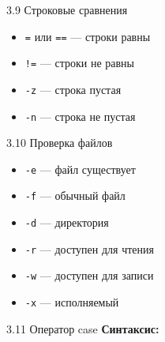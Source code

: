 \documentclass[
  ignorenonframetext,
  aspectratio=169,
  russian,
]{beamer}
\newenvironment{Shaded}{\begin{snugshade}}{\end{snugshade}}
\newcommand{\CommentTok}[1]{\textcolor[rgb]{0.37,0.37,0.37}{#1}}
\newcommand{\ControlFlowTok}[1]{\textcolor[rgb]{0.00,0.23,0.31}{\textbf{#1}}}
\newcommand{\KeywordTok}[1]{\textcolor[rgb]{0.00,0.23,0.31}{\textbf{#1}}}
\newcommand{\PreprocessorTok}[1]{\textcolor[rgb]{0.68,0.00,0.00}{#1}}
\newcommand{\SpecialStringTok}[1]{\textcolor[rgb]{0.13,0.47,0.30}{#1}}
\newcommand{\VariableTok}[1]{\textcolor[rgb]{0.07,0.07,0.07}{#1}}
\providecommand{\tightlist}{%
  \setlength{\itemsep}{0pt}\setlength{\parskip}{0pt}}
\begin{document}
\begin{frame}[fragile]{3.9 Строковые сравнения}
\label{ux441ux442ux440ux43eux43aux43eux432ux44bux435-ux441ux440ux430ux432ux43dux435ux43dux438ux44f}
\begin{itemize}[<+->]
\tightlist
\item
  \texttt{=} или \texttt{==} --- строки равны
\item
  \texttt{!=} --- строки не равны
\item
  \texttt{-z} --- строка пустая
\item
  \texttt{-n} --- строка не пустая
\end{itemize}
\end{frame}

\begin{frame}[fragile]{3.10 Проверка файлов}
\label{ux43fux440ux43eux432ux435ux440ux43aux430-ux444ux430ux439ux43bux43eux432}
\begin{itemize}[<+->]
\tightlist
\item
  \texttt{-e} --- файл существует
\item
  \texttt{-f} --- обычный файл
\item
  \texttt{-d} --- директория
\item
  \texttt{-r} --- доступен для чтения
\item
  \texttt{-w} --- доступен для записи
\item
  \texttt{-x} --- исполняемый
\end{itemize}
\end{frame}

\begin{frame}[fragile]{3.11 Оператор case}
\label{ux43eux43fux435ux440ux430ux442ux43eux440-case}
\textbf{Синтаксис:}

\begin{Shaded}
\end{Shaded}
\end{frame}
\end{document}
